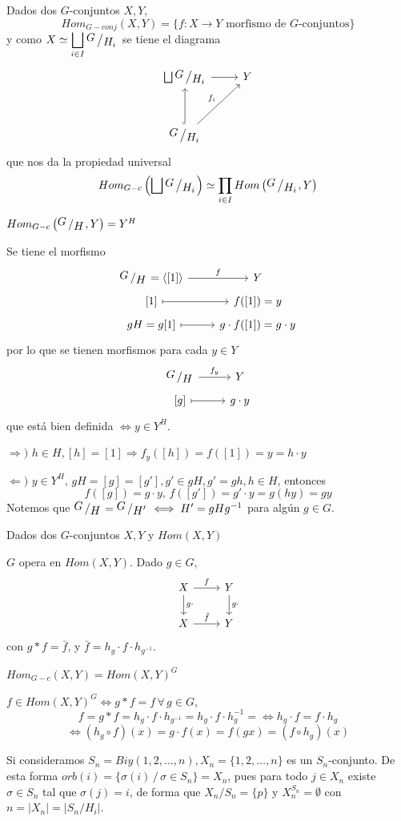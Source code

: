 \begin{defi}
    Dados dos $G$-conjuntos $X,Y$,
    $$Hom_{G-conj}(X,Y) = \{f:X\to Y \text{ morfismo de }G\text{-conjuntos}\}$$
    y como $\displaystyle X \simeq \bigsqcup_{i \in I} \modulo{G}{H_i}$ se tiene el diagrama 
    $$\bt \bigsqcup \modulo{G}{H_i} \rar & Y \\[5mm] \modulo{G}{H_i} \arrow[hook]{u} \arrow{ur}{f_i} \et$$
    que nos da la propiedad universal
    $$Hom_{G-c}\left(\bigsqcup \modulo{G}{H_i}\right) \simeq \prod_{i \in I} Hom\left(\modulo{G}{H_i}, Y\right)$$
\end{defi} 
\begin{prop}
    $Hom_{G-c}\left(\modulo{G}{H}, Y\right)= Y^H$
\end{prop}
\begin{dem}
Se tiene el morfismo 
$$\bt \modulo{G}{H}= \langle [1] \rangle \rar{f} & Y \\[-5mm] {[1]} \rarmaps & f({[1]})=y \\[-5mm] gH = g{[1]} \rarmaps &  g\cdot f({[1]}) = g\cdot y  \et$$
por lo que se tienen morfismos para cada $y \in Y$
$$\bt \modulo{G}{H}\rar{f_y} & Y \\[-5mm] {[g]} \rarmaps & g\cdot y \et$$
que est\'a bien definida $\iff y \in Y^H$.

$\Rightarrow)$ $h \in H, [h] = [1] \Rightarrow f_y([h]) = f([1]) = y  = h\cdot y$

$\Leftarrow)$ $y \in Y^H, \, gH=[g]=[g'], g'\in gH, g'=gh, h\in H$, entonces
$$f([g]) = g\cdot y,\, f([g']) = g' \cdot y = g(hy) = gy$$
Notemos que $\modulo{G}{H}= \modulo{G}{H'} \iff H' = g H g^{-1}$ para alg\'un $g \in G$. 
\end{dem}
Dados dos $G$-conjuntos $X,Y$ y $Hom(X,Y)$
\begin{prop}
$G$ opera en $Hom(X,Y)$. Dado $g\in G$,
$$ \bt X \arrow{d}{g\cdot } \rar{f}  & Y\arrow{d}{g\cdot }  \\ X \rar{\bar f} & Y \et$$
con $g*f=\bar f$, y $\bar f=h_g \cdot f \cdot h_{g^{-1}}$. 
\end{prop}
\begin{cor}
$Hom_{G-c}(X,Y) = Hom(X,Y)^G$
\end{cor}\begin{dem}
$f \in Hom(X,Y)^G \iff g*f = f \, \forall \, g\in G$, 
$$f = g*f = h_g \cdot f \cdot h_{g^{-1}} = h_g \cdot f \cdot h^{-1}_{g} = \iff h_g \cdot f = f \cdot h_g $$
$$ \iff (h_g \circ f)(x) = g\cdot f(x) = f(gx) = (f\circ h_g)(x)$$
\end{dem}
\begin{ejem}
    Si consideramos $S_n = Biy(1,2, \ldots, n), X_n=\{1, 2, \ldots, n\} $ es un $S_n$-conjunto. De esta forma $orb(i) = \{\sigma(i) \, /\, \sigma \in S_n \} = X_n$, pues para todo $j \in X_n$ existe $\sigma\in S_n$ tal que $\sigma(j) = i$, de forma que $X_n / S_n = \{p\}$ y $X_n^{S_n} = \emptyset$ con $n=|X_n| = |S_n/H_i|$.  
\end{ejem}

